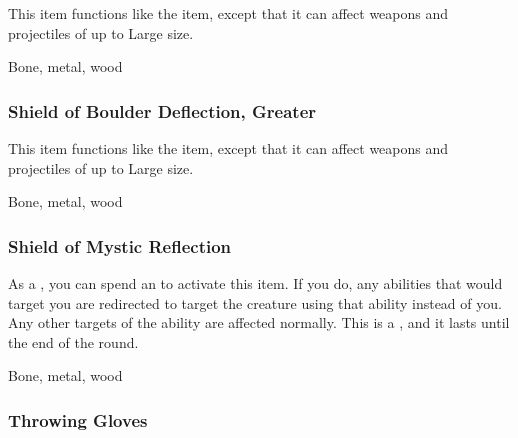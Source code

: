 This item functions like the  item, except that it can affect weapons and projectiles of up to Large size.



 


 Bone, metal, wood


\lowercase{\hypertarget{item:Shield of Boulder Deflection, Greater}{}}\label{item:Shield of Boulder Deflection, Greater}
\hypertarget{item:Shield of Boulder Deflection, Greater}{\subsubsection{Shield of Boulder Deflection, Greater\hfill{}}}

This item functions like the  item, except that it can affect weapons and projectiles of up to Large size.



 


 Bone, metal, wood


\lowercase{\hypertarget{item:Shield of Mystic Reflection}{}}\label{item:Shield of Mystic Reflection}
\hypertarget{item:Shield of Mystic Reflection}{\subsubsection{Shield of Mystic Reflection\hfill{}}}

As a , you can spend an  to activate this item.
If you do, any   abilities that would target you are redirected to target the creature using that ability instead of you.
Any other targets of the ability are affected normally.
This is a , and it lasts until the end of the round.



 


 Bone, metal, wood


\lowercase{\hypertarget{item:Throwing Gloves}{}}\label{item:Throwing Gloves}
\hypertarget{item:Throwing Gloves}{\subsubsection{Throwing Gloves\hfill{}}}

